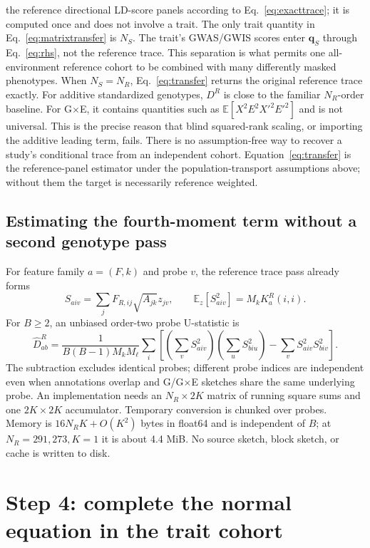 \documentclass[11pt]{article}
\newcommand{\E}{\mathbb E}
\begin{document}
the reference directional LD-score panels according to
Eq.~\eqref{eq:exacttrace}; it is computed once and does not involve a trait.
The only trait quantity in Eq.~\eqref{eq:matrixtransfer} is $N_S$.  The trait's
GWAS/GWIS scores enter $\bm q_S$ through Eq.~\eqref{eq:rhs}, not the reference
trace.  This separation is what permits one all-environment reference cohort
to be combined with many differently masked phenotypes.
When $N_S=N_R$, Eq.~\eqref{eq:transfer} returns the original reference trace
exactly.  For additive standardized genotypes, $D^R$ is close to the familiar
$N_R$-order baseline.  For G$\times$E, it contains quantities such as
$\E[X^2E^2X'^2E'^2]$ and is not universal.  This is the precise reason that
blind squared-rank scaling, or importing the additive leading term, fails.
There is no assumption-free way to recover a study's conditional trace from
an independent cohort.  Equation~\eqref{eq:transfer} is the reference-panel
estimator under the population-transport assumptions above; without them the
target is necessarily reference weighted.

\subsection{Estimating the fourth-moment term without a second genotype pass}

For feature family $a=(F,k)$ and probe $v$, the reference trace pass already
forms
\begin{equation}
 S_{aiv}=\sum_jF_{R,ij}\sqrt{A_{jk}}z_{jv},
 \qquad \E_z[S_{aiv}^2]=M_kK^R_a(i,i).
\end{equation}
For $B\ge2$, an unbiased order-two probe U-statistic is
\begin{equation}
 \widehat D^R_{ab}=
 \frac{1}{B(B-1)M_kM_\ell}
 \sum_i\left[
  \left(\sum_vS_{aiv}^2\right)\left(\sum_uS_{biu}^2\right)
  -\sum_vS_{aiv}^2S_{biv}^2
 \right].
 \label{eq:ustat}
\end{equation}
The subtraction excludes identical probes; different probe indices are
independent even when annotations overlap and G/G$\times$E sketches share the
same underlying probe.  An implementation needs an $N_R\times2K$ matrix of
running square sums and one $2K\times2K$ accumulator.  Temporary conversion is
chunked over probes.  Memory is $16N_RK+O(K^2)$ bytes in float64 and is
independent of $B$; at $N_R=291{,}273,K=1$ it is about 4.4 MiB.  No source
sketch, block sketch, or cache is written to disk.

\section{Step 4: complete the normal equation in the trait cohort}
\end{document}
